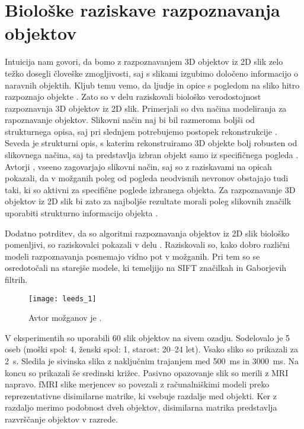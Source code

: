 \section{Biološke raziskave razpoznavanja objektov}
Intuicija nam govori, da bomo z razpoznavanjem 3D objektov iz 2D slik zelo težko dosegli človeške zmogljivosti, saj s slikami izgubimo določeno informacijo o naravnih objektih. Kljub temu vemo, da ljudje in opice s pogledom na sliko hitro razpoznajo objekte \cite{rajalingham2018largescale}. Zato so v delu \cite{tarr1998image} raziskovali biološko verodostojnost razpoznavnja 3D objektov iz 2D slik. Primerjali so dva načina modeliranja za rapoznavanje objektov. Slikovni način naj bi bil razmeroma boljši od strukturnega opisa, saj pri slednjem potrebujemo postopek rekonstrukcije \cite{tarr1998image}. Seveda je strukturni opis, s katerim rekonstruiramo 3D objekte bolj robusten od slikovnega načina, saj ta predstavlja izbran objekt samo iz specifičnega pogleda \cite{tarr1998image}. Avtorji \cite{tarr1998image}, vseeno zagovarjajo slikovni način, saj so z raziskavami na opicah pokazali, da v možganih poleg od pogleda neodvisnih nevronov obstajajo tudi taki, ki so aktivni za specifične poglede izbranega objekta. Za razpoznavanje 3D objektov iz 2D slik bi zato za najboljše rezultate morali poleg slikovnih značilk uporabiti strukturno informacijo objekta \cite{tarr1998image}.  

Dodatno potrditev, da so algoritmi razpoznavanja objektov iz 2D slik biološko pomenljivi, so raziskovalci pokazali v delu \cite{leeds2013comparing}. Raziskovali so, kako dobro različni modeli razpoznavanja posnemajo vidno pot v možganih. Pri tem so se osredotočali na starejše modele, ki temeljijo na SIFT značilkah in Gaborjevih filtrih. 

\begin{figure}[!htbp]
	\centering
	\texttt{[image: leeds\_1]}
	\caption{Avtor možganov je \cite{brain}.}
\end{figure}


V eksperimentih so uporabili 60 slik objektov na sivem ozadju. Sodelovalo je 5 oseb (moški spol: 4, ženski spol: 1, starost: 20--24 let). Vsako sliko so prikazali za \SI{2}{\s}. Sledila je sivinska slika z naključnim trajanjem med \SI{500}{\ms} in \SI{3000}{\ms}. Na koncu so prikazali še sredinski križec. Pasivno opazovanje slik so merili z MRI napravo. fMRI slike merjencev so povezali z računalniškimi modeli preko reprezentativne disimilarne matrike, ki vsebuje razdalje med objekti. Ker z razdaljo merimo podobnost dveh objektov, disimilarna matrika predstavlja razvrščanje objektov v razrede. 


